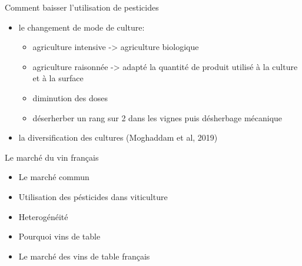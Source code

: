 \documentclass[11pt,ignorenonframetext,]{beamer}
\providecommand{\tightlist}{%
  \setlength{\itemsep}{0pt}\setlength{\parskip}{0pt}}
\begin{document}
\begin{frame}{Comment baisser l'utilisation de pesticides}
\protect\hypertarget{comment-baisser-lutilisation-de-pesticides}{}

\begin{itemize}
\tightlist
\item
  le changement de mode de culture:

  \begin{itemize}
  \tightlist
  \item
    agriculture intensive -\textgreater{} agriculture biologique
  \item
    agriculture raisonnée -\textgreater{} adapté la quantité de produit
    utilisé à la culture et à la surface
  \item
    diminution des doses
  \item
    déserherber un rang sur 2 dans les vignes puis désherbage mécanique
  \end{itemize}
\item
  la diversification des cultures (Moghaddam et al, 2019)
\end{itemize}

\end{frame}

\begin{frame}{Le marché du vin français}
\protect\hypertarget{le-marche-du-vin-francais}{}

\begin{itemize}
\tightlist
\item
  Le marché commun
\item
  Utilisation des pésticides dans viticulture
\item
  Heterogénéité
\item
  Pourquoi vins de table
\item
  Le marché des vins de table français
\end{itemize}

\end{frame}
\end{document}
